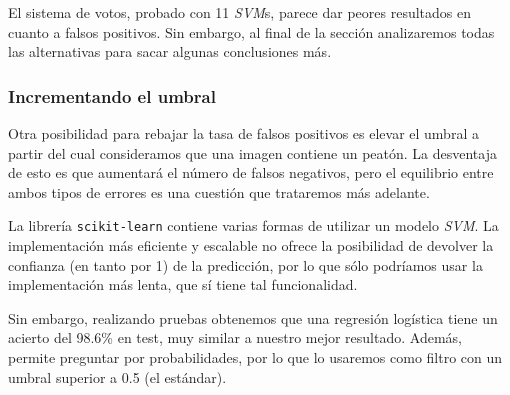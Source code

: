 \documentclass[11pt,a4paper]{article}
\begin{document}
                \par
                El sistema de votos, probado con 11 \textit{SVM}s, parece dar peores resultados en cuanto a falsos positivos. Sin embargo, al final de la sección analizaremos todas las alternativas para sacar algunas conclusiones más.

            \subsubsection{Incrementando el umbral}

                \par
                Otra posibilidad para rebajar la tasa de falsos positivos es elevar el umbral a partir del cual consideramos que una imagen contiene un peatón. La desventaja de esto es que aumentará el número de falsos negativos, pero el equilibrio entre ambos tipos de errores es una cuestión que trataremos más adelante.

                \par
                La librería \texttt{scikit-learn} contiene varias formas de utilizar un modelo \textit{SVM}. La implementación más eficiente y escalable no ofrece la posibilidad de devolver la confianza (en tanto por 1) de la predicción, por lo que sólo podríamos usar la implementación más lenta, que sí tiene tal funcionalidad.

                \par
                Sin embargo, realizando pruebas obtenemos que una regresión logística tiene un acierto del 98.6\% en test, muy similar a nuestro mejor resultado. Además, permite preguntar por probabilidades, por lo que lo usaremos como filtro con un umbral superior a 0.5 (el estándar).
\end{document}
